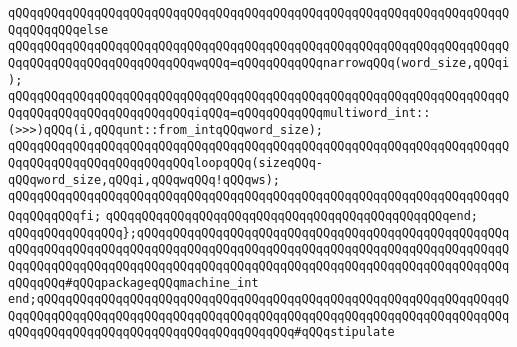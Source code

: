 \verb|qQQqqQQqqQQqqQQqqQQqqQQqqQQqqQQqqQQqqQQqqQQqqQQqqQQqqQQqqQQqqQQqqQQqqQQqqQQqqQQqelse|\newline
\verb|qQQqqQQqqQQqqQQqqQQqqQQqqQQqqQQqqQQqqQQqqQQqqQQqqQQqqQQqqQQqqQQqqQQqqQQqqQQqqQQqqQQqqQQqqQQqqQQqwqQQq=qQQqqQQqqQQqnarrowqQQq(word_size,qQQqi);|\newline
\verb|qQQqqQQqqQQqqQQqqQQqqQQqqQQqqQQqqQQqqQQqqQQqqQQqqQQqqQQqqQQqqQQqqQQqqQQqqQQqqQQqqQQqqQQqqQQqqQQqiqQQq=qQQqqQQqqQQqmultiword_int::(>>>)qQQq(i,qQQqunt::from_intqQQqword_size);|\newline
\newline
\verb|qQQqqQQqqQQqqQQqqQQqqQQqqQQqqQQqqQQqqQQqqQQqqQQqqQQqqQQqqQQqqQQqqQQqqQQqqQQqqQQqqQQqqQQqqQQqqQQqloopqQQq(sizeqQQq-qQQqword_size,qQQqi,qQQqwqQQq!qQQqws);|\newline
\verb|qQQqqQQqqQQqqQQqqQQqqQQqqQQqqQQqqQQqqQQqqQQqqQQqqQQqqQQqqQQqqQQqqQQqqQQqqQQqqQQqfi;|\newline
\verb|qQQqqQQqqQQqqQQqqQQqqQQqqQQqqQQqqQQqqQQqqQQqqQQqend;|\newline
\verb|qQQqqQQqqQQqqQQq};qQQqqQQqqQQqqQQqqQQqqQQqqQQqqQQqqQQqqQQqqQQqqQQqqQQqqQQqqQQqqQQqqQQqqQQqqQQqqQQqqQQqqQQqqQQqqQQqqQQqqQQqqQQqqQQqqQQqqQQqqQQqqQQqqQQqqQQqqQQqqQQqqQQqqQQqqQQqqQQqqQQqqQQqqQQqqQQqqQQqqQQqqQQqqQQqqQQqqQQq#qQQqpackageqQQqmachine_int|\newline
\newline
\verb|end;qQQqqQQqqQQqqQQqqQQqqQQqqQQqqQQqqQQqqQQqqQQqqQQqqQQqqQQqqQQqqQQqqQQqqQQqqQQqqQQqqQQqqQQqqQQqqQQqqQQqqQQqqQQqqQQqqQQqqQQqqQQqqQQqqQQqqQQqqQQqqQQqqQQqqQQqqQQqqQQqqQQqqQQqqQQqqQQq#qQQqstipulate|\newline
\newline
\newline
\newline
\newline
\newline
\newline
\newline
\newline
\newline

